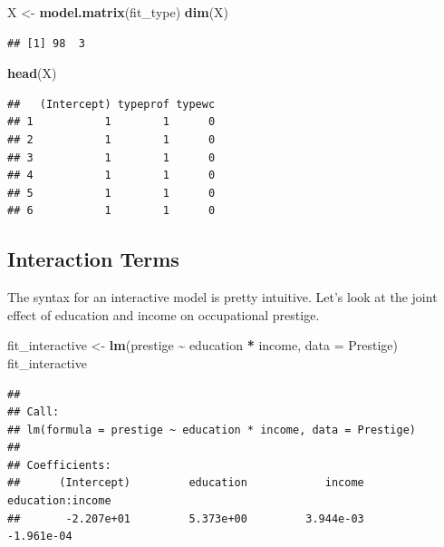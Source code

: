 \documentclass[
  12pt,
  oneside,openany]{book}
\newenvironment{Shaded}{\begin{snugshade}}{\end{snugshade}}
\newcommand{\DataTypeTok}[1]{\textcolor[rgb]{0.13,0.29,0.53}{#1}}
\newcommand{\KeywordTok}[1]{\textcolor[rgb]{0.13,0.29,0.53}{\textbf{#1}}}
\newcommand{\NormalTok}[1]{#1}
\newcommand{\OperatorTok}[1]{\textcolor[rgb]{0.81,0.36,0.00}{\textbf{#1}}}
\newcommand{\StringTok}[1]{\textcolor[rgb]{0.31,0.60,0.02}{#1}}
\begin{document}
\begin{Shaded}
\begin{Highlighting}[]
\NormalTok{X \textless{}{-}}\StringTok{ }\KeywordTok{model.matrix}\NormalTok{(fit\_type)}
\KeywordTok{dim}\NormalTok{(X)}
\end{Highlighting}
\end{Shaded}

\begin{verbatim}
## [1] 98  3
\end{verbatim}

\begin{Shaded}
\begin{Highlighting}[]
\KeywordTok{head}\NormalTok{(X)}
\end{Highlighting}
\end{Shaded}

\begin{verbatim}
##   (Intercept) typeprof typewc
## 1           1        1      0
## 2           1        1      0
## 3           1        1      0
## 4           1        1      0
## 5           1        1      0
## 6           1        1      0
\end{verbatim}

\hypertarget{interaction-terms-1}{%
\subsection{Interaction Terms}\label{interaction-terms-1}}

The syntax for an interactive model is pretty intuitive. Let's look at the joint effect of education and income on occupational prestige.

\begin{Shaded}
\begin{Highlighting}[]
\NormalTok{fit\_interactive \textless{}{-}}\StringTok{ }\KeywordTok{lm}\NormalTok{(prestige }\OperatorTok{\textasciitilde{}}\StringTok{ }\NormalTok{education }\OperatorTok{*}\StringTok{ }\NormalTok{income, }\DataTypeTok{data =}\NormalTok{ Prestige)}
\NormalTok{fit\_interactive}
\end{Highlighting}
\end{Shaded}

\begin{verbatim}
## 
## Call:
## lm(formula = prestige ~ education * income, data = Prestige)
## 
## Coefficients:
##      (Intercept)         education            income  education:income  
##       -2.207e+01         5.373e+00         3.944e-03        -1.961e-04
\end{verbatim}
\end{document}

